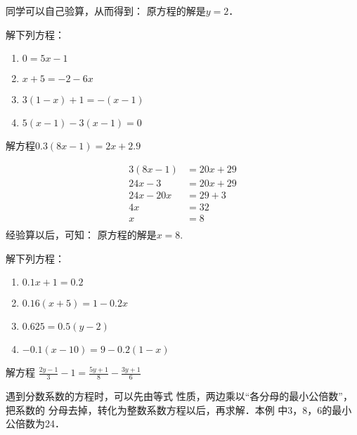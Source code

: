 同学可以自己验算，从而得到： 原方程的解是$y=2$．


\begin{ex}
解下列方程： 
\begin{multicols}{2}
    \begin{enumerate}
\item $0=5x-1$
\item   $x+5=-2-6x$
\item $3(1-x)+1=-(x-1)$      
\item $5(x-1)-3(x-1)=0$
    \end{enumerate}
\end{multicols}
\end{ex}

\begin{example}
    解方程$0.3(8x-1)=2x+2.9$
\end{example}

\begin{solution}
\begin{align*}
    3 (8x-1)&=20x+29  \tag{原方程两边乘以10}\\
    24x-3&=20x+29   \tag{去括号}\\
    24x-20x&=29+3\tag{移项变号}\\
    4x &= 32\tag{合并同类项}\\
    x&=8\tag{两边除以4}\\
\end{align*}
经验算以后，可知：
原方程的解是$x=8$.    
\end{solution}

\begin{ex}
解下列方程：
\begin{multicols}{2}
\begin{enumerate}
    \item $0.1x+1=0.2$
    \item $0.16(x+5)=1-0.2x$
    \item $0.625=0.5(y-2)$
    \item $-0.1(x-10)=9-0.2(1-x)$
\end{enumerate}
\end{multicols}
\end{ex}

\begin{example}
  解方程
$\frac{2y-1}{3}-1=\frac{5y+1}{8}-\frac{3y+1}{6}$
\end{example}

\begin{analyze}
   遇到分数系数的方程时，可以先由等式
    性质，两边乘以“各分母的最小公倍数”，把系数的
    分母去掉，转化为整数系数方程以后，再求解．本例
    中3，8，6的最小公倍数为24．
\end{analyze}

